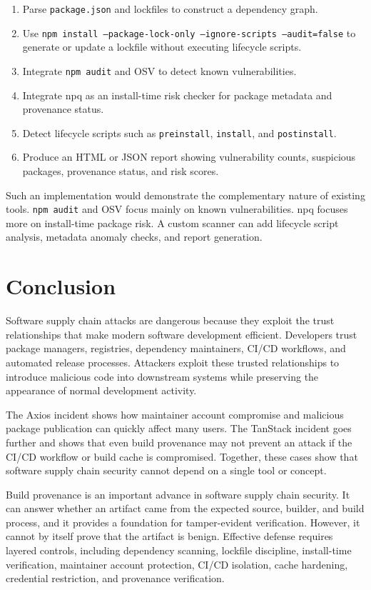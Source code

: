 \documentclass[12pt,a4paper]{article}
\begin{document}
\begin{enumerate}[label=(\arabic*)]
  \item Parse \texttt{package.json} and lockfiles to construct a dependency graph.
  \item Use \texttt{npm install --package-lock-only --ignore-scripts --audit=false} to generate or update a lockfile without executing lifecycle scripts.
  \item Integrate \texttt{npm audit} and OSV to detect known vulnerabilities.
  \item Integrate npq as an install-time risk checker for package metadata and provenance status.
  \item Detect lifecycle scripts such as \texttt{preinstall}, \texttt{install}, and \texttt{postinstall}.
  \item Produce an HTML or JSON report showing vulnerability counts, suspicious packages, provenance status, and risk scores.
\end{enumerate}

Such an implementation would demonstrate the complementary nature of existing tools. \texttt{npm audit} and OSV focus mainly on known vulnerabilities. npq focuses more on install-time package risk. A custom scanner can add lifecycle script analysis, metadata anomaly checks, and report generation.

\section{Conclusion}

Software supply chain attacks are dangerous because they exploit the trust relationships that make modern software development efficient. Developers trust package managers, registries, dependency maintainers, CI/CD workflows, and automated release processes. Attackers exploit these trusted relationships to introduce malicious code into downstream systems while preserving the appearance of normal development activity.

The Axios incident shows how maintainer account compromise and malicious package publication can quickly affect many users. The TanStack incident goes further and shows that even build provenance may not prevent an attack if the CI/CD workflow or build cache is compromised. Together, these cases show that software supply chain security cannot depend on a single tool or concept.

Build provenance is an important advance in software supply chain security. It can answer whether an artifact came from the expected source, builder, and build process, and it provides a foundation for tamper-evident verification. However, it cannot by itself prove that the artifact is benign. Effective defense requires layered controls, including dependency scanning, lockfile discipline, install-time verification, maintainer account protection, CI/CD isolation, cache hardening, credential restriction, and provenance verification.
\end{document}
